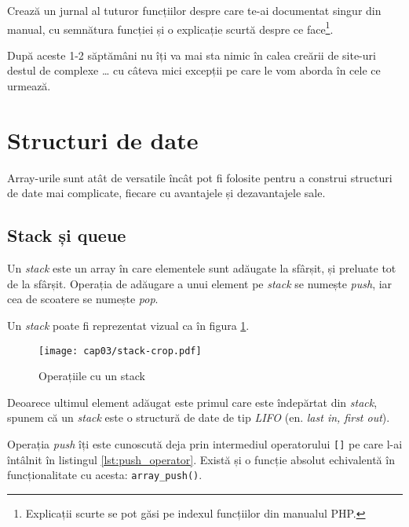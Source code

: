 \begin{Exercise}[difficulty=3,title={Explorează manualul}]
Crează un jurnal al tuturor funcțiilor despre care te-ai documentat
singur din manual, cu semnătura funcției și o explicație scurtă
despre ce face\footnote{Explicații scurte se pot găsi pe indexul
funcțiilor din manualul PHP.}.

După aceste 1-2 săptămâni nu îți va mai sta nimic în calea creării
de site-uri destul de complexe {\ldots} cu câteva mici excepții pe care le vom
aborda \^in cele ce urmează.
\end{Exercise}








\section{Structuri de date}
Array-urile sunt atât de versatile încât pot fi folosite
pentru a construi structuri de date mai complicate, fiecare
cu avantajele și dezavantajele sale.

\subsection{Stack și queue}
Un \textsl{stack} este un array în care elementele sunt adăugate la sfârșit,
și preluate tot de la sfârșit. Operația de adăugare a unui element
pe \textit{stack} se numește \textsl{push}, iar cea de scoatere se numește \textsl{pop}.

Un \textit{stack} poate fi reprezentat vizual ca în figura \ref{fig:stack}.

\begin{figure}[ht!]
  \centering
    \texttt{[image: cap03/stack-crop.pdf]}
  \caption{Operațiile cu un stack}
  \label{fig:stack}
\end{figure}

Deoarece ultimul element adăugat este primul care este îndepărtat
din \textit{stack}, spunem că un \textit{stack} este o structură de date
de tip \textsl{LIFO} (en. \textsl{last in, first out}).

Operația \textit{push} îți este cunoscută deja prin intermediul
operatorului \texttt{[]} pe care l-ai întâlnit în
listingul \ref{lst:push_operator}. Există și o funcție
absolut echivalentă în funcționalitate cu acesta: \texttt{array\_push()}.

